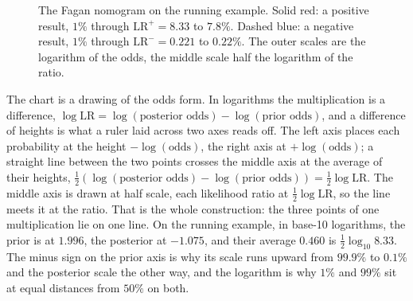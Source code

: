 \documentclass[11pt]{article}
\begin{document}
\begin{figure}[tbp]
\caption{The Fagan nomogram on the running example. Solid red: a positive result, $1\%$ through $\mathrm{LR}^+ = 8.33$ to $7.8\%$. Dashed blue: a negative result, $1\%$ through $\mathrm{LR}^- = 0.221$ to $0.22\%$. The outer scales are the logarithm of the odds, the middle scale half the logarithm of the ratio.}
\label{fig:fagan}
\end{figure}

The chart is a drawing of the odds form. In logarithms the multiplication is a difference, $\log \mathrm{LR} = \log(\text{posterior odds}) - \log(\text{prior odds})$, and a difference of heights is what a ruler laid across two axes reads off. The left axis places each probability at the height $-\log(\text{odds})$, the right axis at $+\log(\text{odds})$; a straight line between the two points crosses the middle axis at the average of their heights, $\tfrac{1}{2}(\log(\text{posterior odds}) - \log(\text{prior odds})) = \tfrac{1}{2}\log \mathrm{LR}$. The middle axis is drawn at half scale, each likelihood ratio at $\tfrac{1}{2}\log \mathrm{LR}$, so the line meets it at the ratio. That is the whole construction: the three points of one multiplication lie on one line. On the running example, in base-10 logarithms, the prior is at $1.996$, the posterior at $-1.075$, and their average $0.460$ is $\tfrac{1}{2}\log_{10} 8.33$. The minus sign on the prior axis is why its scale runs upward from $99.9\%$ to $0.1\%$ and the posterior scale the other way, and the logarithm is why $1\%$ and $99\%$ sit at equal distances from $50\%$ on both.
\end{document}
